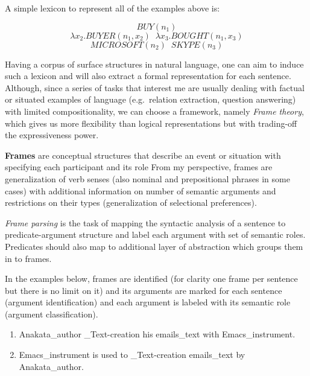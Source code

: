    A simple lexicon to represent all of the examples above is:
  
   $$ BUY(n_1)$$
   $$ \lambda x_2.BUYER(n_1 , x_2) \; \;  \lambda x_3.BOUGHT(n_1 , x_3) $$
   $$ MICROSOFT(n_2) \; \; SKYPE(n_3)$$
   
   Having a corpus of surface structures in natural language, one can aim to
   induce such a lexicon and will also extract a formal representation for each sentence.
   Although, since a series of tasks that interest me are usually dealing with
   factual or situated examples of language (e.g.\ relation extraction,
   question answering) with limited compositionality, we can choose a framework,
   namely \textit{Frame theory}, which gives us more flexibility than logical
   representations but with trading-off the expressiveness power.
   
   \textbf{Frames} are conceptual structures that describe an event or situation
   with specifying each participant and its role 
   From my
   perspective, frames are generalization of verb  senses (also nominal and
   prepositional phrases in some cases) with additional information on number
   of semantic arguments and restrictions on their types (generalization of
   selectional preferences).
   
   \textit{Frame parsing} is the task of mapping the
syntactic analysis of a sentence to predicate-argument structure and label each
argument with set of semantic roles. Predicates should also map to additional
layer of abstraction which groups them in to frames.

In the examples below, frames are identified (for clarity one frame per
sentence but there is no limit on it) and its arguments are marked for each
sentence (argument identification) and each argument is labeled with its semantic role (argument classification). 

\begin{enumerate}
  
    \item \lbrack Anakata\rbrack_{author}  
    \rbrack_{Text-creation} his \lbrack
    emails\rbrack_{text} with \lbrack
    Emacs\rbrack_{instrument}.
    \item  \lbrack Emacs\rbrack_{instrument} is
    used to 
    \rbrack_{Text-creation}  \lbrack
    emails\rbrack_{text} by \lbrack
    Anakata\rbrack_{author}.
  \end{enumerate}

